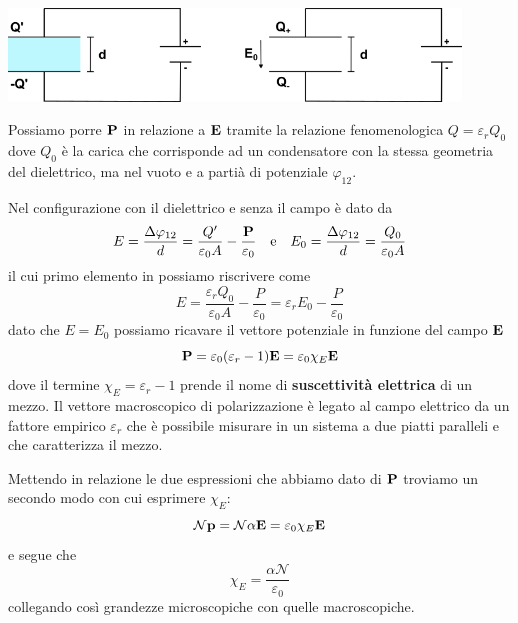 \begin{center}
	\includegraphics[width = 12cm]{images/faraday_exp2}
\end{center} 
Possiamo porre $\bold{P}$ in relazione a $\bold{E}$ tramite la relazione fenomenologica $Q = \varepsilon_r Q_0$ dove $Q_0$ \`e la carica che corrisponde ad un condensatore con la stessa geometria del dielettrico, ma nel vuoto e a parti\`a di potenziale $\varphi_{12}$.
 
 Nel configurazione con il dielettrico e senza il campo \`e dato da 
 \begin{equation*}
 	E = \frac{\Delta \varphi_{12}}{d} = \frac{Q'}{\varepsilon_0A} - \frac{\bold{P}}{\varepsilon_0} \quad \text{e} \quad E_0 = \frac{\Delta \varphi_{12}}{d}  = \frac{Q_0}{\varepsilon_0 A}
 \end{equation*} 
 il cui primo elemento in possiamo riscrivere come
 \begin{equation*}
 	E = \frac{\varepsilon_{r}Q_0}{\varepsilon_0 A} - \frac{P}{\varepsilon_0} = \varepsilon_r E_0 - \frac{P}{\varepsilon_0}
 \end{equation*}
 dato che $E = E_0$ possiamo ricavare il vettore potenziale in funzione del campo $\bold{E}$
 \begin{equation}
 	\bold{P} = \varepsilon_0(\varepsilon_r -1) \bold{E} = \varepsilon_0 \chi_{E} \bold{E}
 \end{equation}
 dove il termine $\chi_{E} = \varepsilon_{r}-1$ prende il nome di \textbf{suscettivit\`a elettrica} di un mezzo.  Il vettore macroscopico di polarizzazione \`e legato al campo elettrico da un fattore empirico $\varepsilon_{r}$ che \`e possibile misurare in un sistema a due piatti paralleli e che caratterizza il mezzo.
 
 Mettendo in relazione le due espressioni che abbiamo dato di $\bold{P}$ troviamo un secondo modo con cui esprimere $\chi_{E}$:
 \begin{equation*}
 	\mathcal{N} \bold{p} =\mathcal{N} \alpha \bold{E} = \varepsilon_0 \chi_{E} \bold{E}
 \end{equation*}
 e segue che 
 \begin{equation}
 	\chi_{E} = \frac{\alpha \mathcal{N}}{\varepsilon_0}
 \end{equation}
 collegando cos\`i grandezze microscopiche con quelle macroscopiche. 
 
